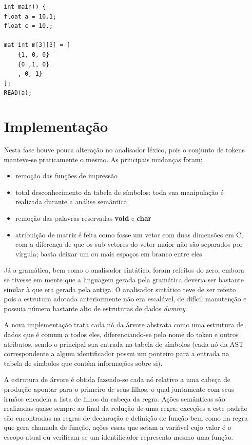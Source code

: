 \documentclass[
	article,			%
	11pt,				%
	oneside,			%
	a4paper,			%
	english,			%
	brazil,				%
	sumario=tradicional
	]{abntex2}
\renewcommand{\it}[1]{\textit{#1}}
\renewcommand{\bf}[1]{\textbf{#1}}
\begin{document}
\begin{lstlisting}[style=CStyle]
int main() {
float a = 10.1;
float c = 10.;

mat int m[3][3] = [
	{1, 0, 0} 
	{0 ,1, 0} 
	, 0, 1}
];
READ(a);
\end{lstlisting}
\fi

\section{Implementação}
\label{implementacao}

Nesta fase houve pouca alteração no analisador léxico, pois o conjunto de tokens manteve-se praticamente o mesmo. As principais mudanças foram:
\begin{itemize}
	\item remoção das funções de impressão
	\item total desconhecimento da tabela de símbolos: toda sua manipulação é realizada durante a análise semântica
	\item remoção das palavras reservadas \bf{void} e \bf{char}
	\item atribuição de matriz é feita como fosse um vetor com duas dimensões em C, com a diferença de que os sub-vetores do vetor maior não são separados por vírgula; basta deixar um ou mais espaços em branco entre eles
\end{itemize}

Já a gramática, bem como o analisador sintático, foram refeitos do zero, 
embora se tivesse em mente que a linguagem gerada pela gramática deveria ser bastante similar à que era gerada pela antiga. O analisador sintático teve de ser refeito pois a estrutura adotada 
anteriormente não era escalável, de difícil manutenção e possuia número bastante alto de estruturas de dados \it{dummy}.

A nova implementação trata cada nó da árvore abstrata como uma estrutura de dados que é comum a todos eles, diferenciando-se pelo nome do token e outros atributos, sendo o principal sua entrada na tabela de símbolos (cada nó da AST correspondente a algum identificador possui um 
ponteiro para a entrada na tabela de símbolos que contém informações sobre si).

A estrutura de árvore é obtida fazendo-se cada nó relativo a uma cabeça de produção apontar para o primeiro de seus filhos, o qual juntamente com seus irmãos encadeia a lista de filhos da cabeça da regra. Ações semânticas são realizadas quase sempre ao final da redução de uma regra; exceções a este padrão
são encontradas na regras de declaração e definição de função bem como na regra que gera chamada de função, ações essas que setam a variável cujo valor é o escopo atual ou verificam se um
identificador representa mesmo uma função.
\end{document}
